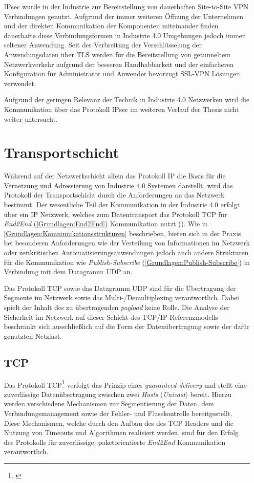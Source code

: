\ac{IPsec} wurde in der Industrie zur Bereitstellung von dauerhaften Site-to-Site \ac{VPN} Verbindungen genutzt. Aufgrund der immer weiteren Öffnung der Unternehmen und der direkten Kommunikation der Komponenten miteinander finden dauerhafte diese Verbindungsformen in Industrie 4.0 Umgebungen jedoch immer seltener Anwendung. Seit der Verbreitung der Verschlüsselung der Anwendungsdaten über \ac{TLS} werden für die Bereitstellung von getunneltem Netzwerkverkehr aufgrund der besseren Handhabbarkeit und der einfacheren Konfiguration für Administrator und Anwender bevorzugt \ac{SSL}-\ac{VPN} Lösungen verwendet.

Aufgrund der geringen Relevanz der Technik in Industrie 4.0 Netzwerken wird die Kommunikation über das Protokoll \ac{IPsec} im weiteren Verlauf der Thesis nicht weiter untersucht.

\section{Transportschicht}
\label{Analyse:Transportschicht}
Während auf der Netzwerkschicht allein das Protokoll \ac{IP} die Basis für die Vernetzung und Adressierung von Industrie 4.0 Systemen darstellt, wird das Protokoll der Transportschicht durch die Anforderungen an das Netzwerk bestimmt. Der wesentliche Teil der Kommunikation in der Industrie 4.0 erfolgt über ein \ac{IP} Netzwerk, welches zum Datentransport das Protokoll \ac{TCP} für \textit{End2End} (\autoref{Grundlagen:End2End}) Kommunikation nutzt (\cite{sichKom2017}). Wie in \autoref{Grundlagen:Kommunikationsstrukturen} beschrieben, bieten sich in der Praxis bei besonderen Anforderungen wie der Verteilung von Informationen im Netzwerk oder zeitkritischen Automatisierungsanwendungen jedoch auch andere Strukturen für die Kommunikation wie \textit{Publish-Subscribe} (\autoref{Grundlagen:Publish-Subscribe}) in Verbindung mit dem Datagramm \ac{UDP} an. 

Das Protokoll \ac{TCP} sowie das Datagramm \ac{UDP} sind für die Übertragung der Segmente im Netzwerk sowie das Multi-/Demultiplexing verantwortlich. Dabei spielt der Inhalt des zu übertragenden \textit{payload} keine Rolle. Die Analyse der Sicherheit im Netzwerk auf dieser Schicht des \ac{TCP}/\ac{IP} Referenzmodells beschränkt sich ausschließlich auf die Form der Datenübertragung sowie der dafür genutzten Netzlast.

\subsection{\ac{TCP}}
\label{Analyse:TCP}
Das Protokoll \ac{TCP}\footnote{\cite{TCP}} verfolgt das Prinzip eines \textit{guaranteed delivery} und stellt eine zuverlässige Datenübertragung zwischen zwei \textit{Hosts} (\textit{Unicast}) bereit. Hierzu werden verschiedene Mechanismen zur Segmentierung der Daten, dem Verbindungsmanagement sowie der Fehler- und Flusskontrolle bereitgestellt. Diese Mechanismen, welche durch den Aufbau des des \ac{TCP} Headers und die Nutzung von Timeouts und Algorithmen realisiert werden, sind für den Erfolg des Protokolls für zuverlässige, paketorientierte \textit{End2End} Kommunikation verantwortlich.

